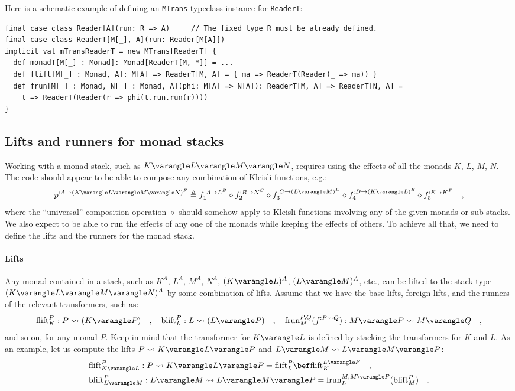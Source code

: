 Here is a schematic example of defining an \lstinline!MTrans! typeclass
instance for \lstinline!ReaderT!:
\begin{lstlisting}
final case class Reader[A](run: R => A)     // The fixed type R must be already defined.
final case class ReaderT[M[_], A](run: Reader[M[A]])
implicit val mTransReaderT = new MTrans[ReaderT] {
  def monadT[M[_] : Monad]: Monad[ReaderT[M, *]] = ...
  def flift[M[_] : Monad, A]: M[A] => ReaderT[M, A] = { ma => ReaderT(Reader(_ => ma)) }
  def frun[M[_] : Monad, N[_] : Monad, A](phi: M[A] => N[A]): ReaderT[M, A] => ReaderT[N, A] =
    t => ReaderT(Reader(r => phi(t.run.run(r))))
}
\end{lstlisting}


\subsection{Lifts and runners for monad stacks}

Working with a monad stack, such as $K\varangle L\varangle M\varangle N$,
requires using the effects of all the monads $K$, $L$, $M$, $N$.
The code should appear to be able to compose any combination of Kleisli
functions, e.g.:
\[
p^{:A\rightarrow(K\varangle L\varangle M\varangle N)^{F}}\triangleq f_{1}^{:A\rightarrow L^{B}}\diamond f_{2}^{:B\rightarrow N^{C}}\diamond f_{3}^{:C\rightarrow(L\varangle M)^{D}}\diamond f_{4}^{:D\rightarrow(K\varangle L)^{E}}\diamond f_{5}^{:E\rightarrow K^{F}}\quad,
\]
where the \textsf{``}universal\textsf{''} composition operation $\diamond$ should
somehow apply to Kleisli functions involving any of the given monads
or sub-stacks. We also expect to be able to run the effects of any
one of the monads while keeping the effects of others. To achieve
all that, we need to define the lifts and the runners for the monad
stack.

\paragraph{Lifts}

Any monad contained in a stack, such as $K^{A}$, $L^{A}$, $M^{A}$,
$N^{A}$, $(K\varangle L)^{A}$, $(L\varangle M)^{A}$, etc., can
be lifted to the stack type $(K\varangle L\varangle M\varangle N)^{A}$
by some combination of lifts. Assume that we have the base lifts,
foreign lifts, and the runners of the relevant transformers, such
as:
\[
\text{flift}_{K}^{P}:P\leadsto(K\varangle P)\quad,\quad\text{blift}_{L}^{P}:L\leadsto(L\varangle P)\quad,\quad\text{frun}_{M}^{P,Q}(f^{:P\leadsto Q}):M\varangle P\leadsto M\varangle Q\quad,
\]
and so on, for any monad $P$. Keep in mind that the transformer for
$K\varangle L$ is defined by stacking the transformers for $K$ and
$L$. As an example, let us compute the lifts $P\leadsto K\varangle L\varangle P$
and $L\varangle M\leadsto L\varangle M\varangle P$: 
\begin{align*}
 & \text{flift}_{K\varangle L}^{P}:P\leadsto K\varangle L\varangle P=\text{flift}_{L}^{P}\bef\text{flift}_{K}^{L\varangle P}\quad,\\
 & \text{blift}_{L\varangle M}^{P}:L\varangle M\leadsto L\varangle M\varangle P=\text{frun}_{L}^{M,M\varangle P}(\text{blift}_{M}^{P})\quad.
\end{align*}

